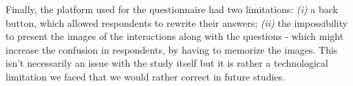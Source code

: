 Finally, the platform used for the questionnaire had two limitations: \textit{(i)} a back button, which allowed respondents to rewrite their answers; \textit{(ii)} the impossibility to present the images of the interactions along with the questions - which might increase the confusion in respondents, by having to memorize the images. This isn't necessarily an issue with the study itself but it is rather a technological limitation we faced that we would rather correct in future studies.